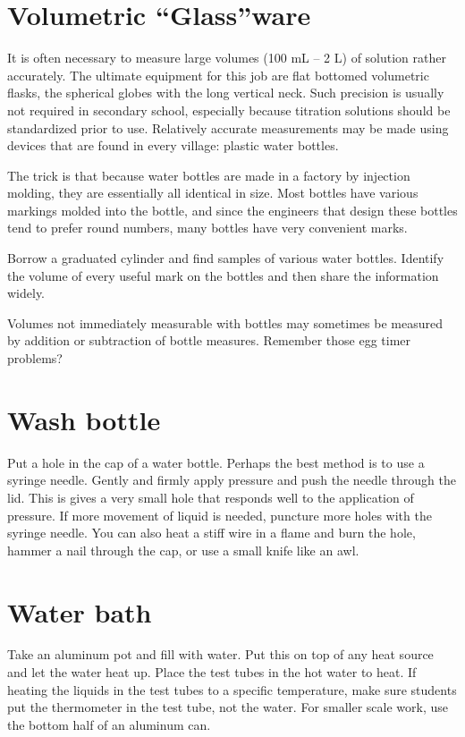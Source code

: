 \section{Volumetric “Glass”ware}
It is often necessary to measure large volumes (100 mL – 2 L) 
of solution rather accurately. 
The ultimate equipment for this job are flat bottomed volumetric flasks, 
the spherical globes with the long vertical neck. 
Such precision is usually not required in secondary school, 
especially because titration solutions should be standardized prior to use. 
Relatively accurate measurements may be made using devices 
that are found in every village: plastic water bottles.

The trick is that because water bottles are made in a factory 
by injection molding, 
they are essentially all identical in size. 
Most bottles have various markings molded into the bottle, 
and since the engineers that design these bottles tend 
to prefer round numbers, 
many bottles have very convenient marks.

Borrow a graduated cylinder and find samples of various water bottles. 
Identify the volume of every useful mark on the bottles 
and then share the information widely.

Volumes not immediately measurable with bottles 
may sometimes be measured by addition or subtraction of bottle measures. 
Remember those egg timer problems?

\section{Wash bottle}
Put a hole in the cap of a water bottle. 
Perhaps the best method is to use a syringe needle. 
Gently and firmly apply pressure and push the needle through the lid. 
This is gives a very small hole 
that responds well to the application of pressure. 
If more movement of liquid is needed, 
puncture more holes with the syringe needle. 
You can also heat a stiff wire in a flame and burn the hole, 
hammer a nail through the cap, 
or use a small knife like an awl.

\section{Water bath}
Take an aluminum pot and fill with water. 
Put this on top of any heat source and let the water heat up. 
Place the test tubes in the hot water to heat. 
If heating the liquids in the test tubes to a specific temperature, 
make sure students put the thermometer in the test tube, 
not the water. 
For smaller scale work, 
use the bottom half of an aluminum can.

